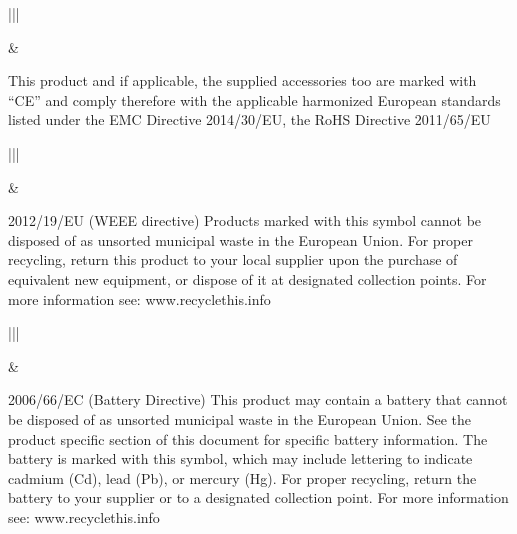 \documentclass[letterpaper,10pt,openany,oneside,english]{sphinxmanual}
\begin{document}


\begin{savenotes}\sphinxattablestart
\centering
\begin{tabular}[t]{|||}
\hline

\noindent{}
&
\\
\hline
\end{tabular}
\par
\sphinxattableend\end{savenotes}

This product and if applicable, the supplied accessories too are marked with “CE” and comply therefore with the applicable harmonized European standards listed under the EMC Directive 2014/30/EU, the RoHS Directive 2011/65/EU


\begin{savenotes}\sphinxattablestart
\centering
\begin{tabular}[t]{|||}
\hline

\noindent{}
&
\\
\hline
\end{tabular}
\par
\sphinxattableend\end{savenotes}

2012/19/EU (WEEE directive) Products marked with this symbol cannot be disposed of as unsorted municipal waste in the European Union. For proper recycling, return this product to your local supplier upon the purchase of equivalent new equipment, or dispose of it at designated collection points. For more information see: www.recyclethis.info


\begin{savenotes}\sphinxattablestart
\centering
\begin{tabular}[t]{|||}
\hline

\noindent{}
&
\\
\hline
\end{tabular}
\par
\sphinxattableend\end{savenotes}

2006/66/EC (Battery Directive) This product may contain a battery that cannot be disposed of as unsorted municipal waste in the European Union. See the product specific section of this document for specific battery information. The battery is marked with this symbol, which may include lettering to indicate cadmium (Cd), lead (Pb), or mercury (Hg). For proper recycling, return the battery to your supplier or to a designated collection point. For more information see: www.recyclethis.info
\end{document}
